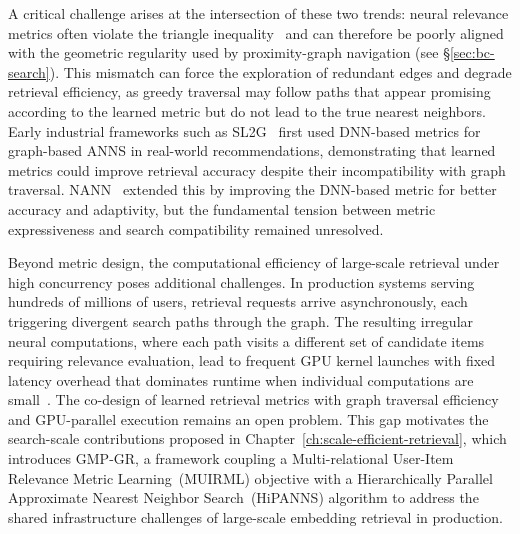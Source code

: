 A critical challenge arises at the intersection of these two trends: neural relevance metrics often violate the triangle inequality~\citep{chen2022approximate} and can therefore be poorly aligned with the geometric regularity used by proximity-graph navigation (see \S\ref{sec:bc-search}). This mismatch can force the exploration of redundant edges and degrade retrieval efficiency, as greedy traversal may follow paths that appear promising according to the learned metric but do not lead to the true nearest neighbors. Early industrial frameworks such as SL2G~\citep{tan2020fast} first used DNN-based metrics for graph-based ANNS in real-world recommendations, demonstrating that learned metrics could improve retrieval accuracy despite their incompatibility with graph traversal. NANN~\citep{chen2022approximate} extended this by improving the DNN-based metric for better accuracy and adaptivity, but the fundamental tension between metric expressiveness and search compatibility remained unresolved.

Beyond metric design, the computational efficiency of large-scale retrieval under high concurrency poses additional challenges. In production systems serving hundreds of millions of users, retrieval requests arrive asynchronously, each triggering divergent search paths through the graph. The resulting irregular neural computations, where each path visits a different set of candidate items requiring relevance evaluation, lead to frequent GPU kernel launches with fixed latency overhead that dominates runtime when individual computations are small~\citep{liu2022lion,liu2021jizhi}. The co-design of learned retrieval metrics with graph traversal efficiency and GPU-parallel execution remains an open problem. This gap motivates the search-scale contributions proposed in Chapter~\ref{ch:scale-efficient-retrieval}, which introduces GMP-GR, a framework coupling a Multi-relational User-Item Relevance Metric Learning~(MUIRML) objective with a Hierarchically Parallel Approximate Nearest Neighbor Search~(HiPANNS) algorithm to address the shared infrastructure challenges of large-scale embedding retrieval in production.
\endinput
